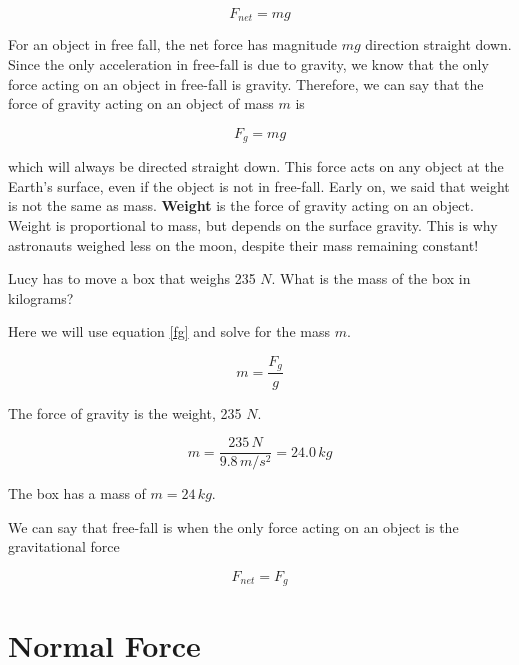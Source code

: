 \documentclass[12pt]{book}
\begin{document}
\begin{equation}
F_{net} = mg
\end{equation}

For an object in free fall, the net force has magnitude $mg$ direction straight down. Since the only acceleration in free-fall is due to gravity, we know that the only force acting on an object in free-fall is gravity. Therefore, we can say that the force of gravity acting on an object of mass $m$ is

\begin{equation}
F_g = mg 
\label{fg}
\end{equation}

which will always be directed straight down. This force acts on any object at the Earth's surface, even if the object is not in free-fall. Early on, we said that weight is not the same as mass. \textbf{Weight} is the force of gravity acting on an object. Weight is proportional to mass, but depends on the surface gravity. This is why astronauts weighed less on the moon, despite their mass remaining constant!

\begin{exampleblock}

Lucy has to move a box that weighs 235 $N$. What is the mass of the box in kilograms?

\hspace{10pt}

Here we will use equation \ref{fg} and solve for the mass $m$.

\begin{equation}
m = \frac{F_g}{g}
\end{equation}

The force of gravity is the weight, 235 $N$.

\begin{equation}
m = \frac{235 \, N}{9.8 \, m/s^2} = 24.0 \, kg
\end{equation}

The box has a mass of $m = 24 \, kg$.

\end{exampleblock}

We can say that free-fall is when the only force acting on an object is the gravitational force

\begin{equation}
F_{net} = F_{g}
\end{equation}

\section{Normal Force}
\label{nfsec}
\end{document}
